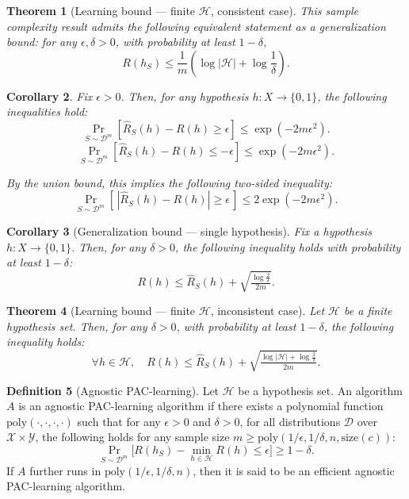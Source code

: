 \documentclass[12pt]{article}
\theoremstyle{definition} %
\newtheorem{definition}{Definition}[section]
\theoremstyle{plain} %
\newtheorem{theorem}[definition]{Theorem}
\newtheorem{corollary}[definition]{Corollary}
\theoremstyle{remark} %
\begin{document}
\begin{CJK}{UTF8}{gbsn}
\begin{theorem}[Learning bound --- finite $\mathcal{H}$, consistent case]
This sample complexity result admits the following equivalent statement 
as a generalization bound: for any $\epsilon, \delta > 0$, with probability at least $1-\delta$,
\[
R(h_S) \leq \frac{1}{m} \left( \log |\mathcal{H}| + \log \frac{1}{\delta} \right).
\tag{2.9}
\]
\end{theorem}

\begin{corollary}
Fix $\epsilon > 0$. Then, for any hypothesis $h: X \to \{0,1\}$, 
the following inequalities hold:
\[
\Pr_{S \sim \mathcal{D}^m}\!\left[ \hat{R}_S(h) - R(h) \geq \epsilon \right] 
    \leq \exp(-2m\epsilon^2). \tag{2.14}
\]
\[
\Pr_{S \sim \mathcal{D}^m}\!\left[ \hat{R}_S(h) - R(h) \leq -\epsilon \right] 
    \leq \exp(-2m\epsilon^2). \tag{2.15}
\]

By the union bound, this implies the following two-sided inequality:
\[
\Pr_{S \sim \mathcal{D}^m}\!\left[ \,|\hat{R}_S(h) - R(h)| \geq \epsilon \,\right] 
    \leq 2 \exp(-2m\epsilon^2). \tag{2.16}
\]
\end{corollary}

\begin{corollary}[Generalization bound --- single hypothesis]
Fix a hypothesis $h: X \to \{0,1\}$. 
Then, for any $\delta > 0$, the following inequality holds with probability at least $1 - \delta$:
\[
R(h) \leq \hat{R}_S(h) + \sqrt{\tfrac{\log \tfrac{2}{\delta}}{2m}}.
\tag{2.17}
\]
\end{corollary}

\begin{theorem}[Learning bound --- finite $\mathcal{H}$, inconsistent case]
Let $\mathcal{H}$ be a finite hypothesis set. 
Then, for any $\delta > 0$, with probability at least $1 - \delta$, the following inequality holds:
\[
\forall h \in \mathcal{H}, \quad 
R(h) \leq \hat{R}_S(h) + \sqrt{\tfrac{\log |\mathcal{H}| + \log \tfrac{2}{\delta}}{2m}}.
\tag{2.20}
\]
\end{theorem}

\begin{definition}[Agnostic PAC-learning]
Let $\mathcal{H}$ be a hypothesis set. 
An algorithm $A$ is an agnostic PAC-learning algorithm if there exists a polynomial function $\mathrm{poly}(\cdot,\cdot,\cdot,\cdot)$ such that for any $\epsilon > 0$ and $\delta > 0$, for all distributions $\mathcal{D}$ over $\mathcal{X} \times \mathcal{Y}$, the following holds for any sample size 
$m \geq \mathrm{poly}(1/\epsilon, 1/\delta, n, \mathrm{size}(c))$:
\[
\Pr_{S \sim \mathcal{D}^m}\!\Big[ R(h_S) - \min_{h \in \mathcal{H}} R(h) \leq \epsilon \Big] \geq 1 - \delta.
\tag{2.21}
\]
If $A$ further runs in $\mathrm{poly}(1/\epsilon, 1/\delta, n)$, then it is said to be an efficient agnostic PAC-learning algorithm.
\end{definition}


\end{CJK}
\end{document}

